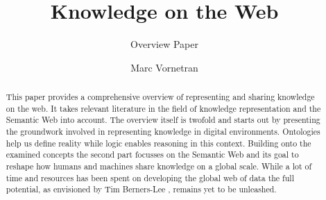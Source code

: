 \documentclass{llncs}
\begin{document}
\pagestyle{plain}

\title{Knowledge on the Web}
\subtitle{Overview Paper}

\author{
	Marc Vornetran
}



\maketitle

\begin{abstract}
This paper provides a comprehensive overview of representing and sharing knowledge on the web.
It takes relevant literature in the field of knowledge representation and the Semantic Web into account.
The overview itself is twofold and starts out by presenting the groundwork involved in representing knowledge in digital environments.
Ontologies help us define reality while logic enables reasoning in this context.
Building onto the examined concepts the second part focusses on the Semantic Web and its goal to reshape how humans and machines share knowledge on a global scale.
While a lot of time and resources has been spent on developing the global web of data the full potential, as envisioned by Tim Berners-Lee \cite{Berners-lee2002b}, remains yet to be unleashed.
\end{abstract}





\end{document}
